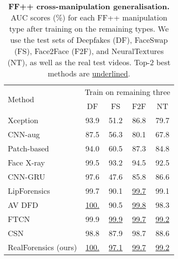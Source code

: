 \documentclass[10pt,twocolumn,letterpaper]{article}
\begin{document}
\begin{table}
\begin{center}
\begin{tabular}{l c c c c}\toprule
\multirow{2}{*}{Method} & \multicolumn{4}{c}{Train on remaining three} \\  
\cmidrule(lr){2-5}
& DF & FS & F2F & NT \\ \midrule
Xception \cite{rossler2019faceforensics++} & 93.9 & 51.2 & 86.8 & 79.7\\
CNN-aug \cite{wang2020cnn} & 87.5 & 56.3 & 80.1 & 67.8\\
Patch-based \cite{chai2020makes} & 94.0 & 60.5 & 87.3 & 84.8 \\
Face X-ray \cite{li2020face} & 99.5 & 93.2 & 94.5 & 92.5 \\
CNN-GRU \cite{sabir2019recurrent} & 97.6 & 47.6 & 85.8 & 86.6 \\
LipForensics \cite{haliassos2021lips} & 99.7 & 90.1 & \underline{99.7} & 99.1 \\
AV DFD \cite{zhou2021joint} & \underline{100.} & 90.5 & \underline{99.8} & 98.3 \\
FTCN \cite{zheng2021exploring} & 99.9 & \underline{99.9} & \underline{99.7} & \underline{99.2} \\ \midrule
CSN & 98.8 & 87.9 & 98.7 & 88.6 \\
RealForensics (ours) & \underline{100.} & \underline{97.1} & \underline{99.7} & \underline{99.2} \\ \bottomrule
\end{tabular}
\end{center}
\caption{\textbf{FF++ cross-manipulation generalisation.} AUC scores (\%) for each FF++ manipulation type after training on the remaining types. We use the test sets of Deepfakes (DF), FaceSwap (FS), Face2Face (F2F), and NeuralTextures (NT), as well as the real test videos. Top-2 best methods are \underline{underlined}.} 
\label{table:ff_cross_manip}
\end{table}
\end{document}

